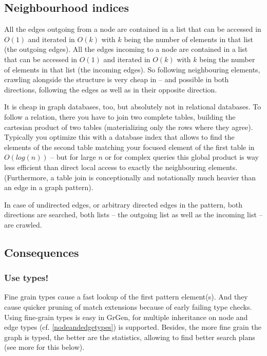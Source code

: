\subsection{Neighbourhood indices}
All the edges outgoing from a node are contained in a list that can be accessed in $O(1)$ and iterated in $O(k)$ with $k$ being the number of elements in that list (the outgoing edges).
All the edges incoming to a node are contained in a list that can be accessed in $O(1)$ and iterated in $O(k)$ with $k$ being the number of elements in that list (the incoming edges).
So following neighbouring elements, crawling alongside the structure is very cheap in \GrG{ } -- and possible in both directions, following the edges as well as in their opposite direction.

It is cheap in graph databases, too, but absolutely not in relational databases.
To follow a relation, there you have to join two complete tables, building the cartesian product of two tables (materializing only the rows where they agree).
Typically you optimize this with a database index that allows to find the elements of the second table matching your focused element of the first table in $O(log(n))$ -- but for large $n$ or for complex queries this global product is way less efficient than direct local access to exactly the neighbouring elements.
(Furthermore, a table join is conceptionally and notationally much heavier than an edge in a graph pattern).

In case of undirected edges, or arbitrary directed edges in the pattern, both directions are searched,
both lists -- the outgoing list as well as the incoming list -- are crawled.

\subsection{Consequences}

\subsubsection*{Use types!}
Fine grain types cause a fast lookup of the first pattern element(s).
And they cause quicker pruning of match extensions because of early failing type checks.
Using fine-grain types is easy in GrGen, for multiple inheritance on node and edge types (cf. \ref{nodeandedgetypes}) is supported.
Besides, the more fine grain the graph is typed, the better are the statistics, allowing \GrG{ } to find better search plans (see more for this below).

